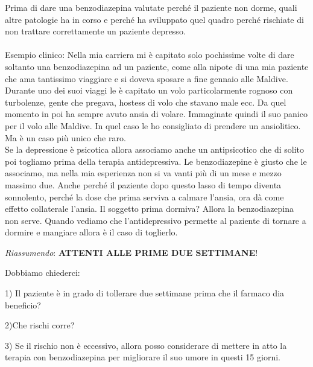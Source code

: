 \begin{itemize}
Prima di dare una benzodiazepina valutate perché il paziente non dorme,
quali altre patologie ha in corso e perché ha sviluppato quel quadro
perché rischiate di non trattare correttamente un paziente depresso.
\\\\
Esempio clinico: Nella mia carriera mi è capitato solo pochissime volte
di dare soltanto una benzodiazepina ad un paziente, come alla nipote di
una mia paziente che ama tantissimo viaggiare e si doveva sposare a fine
gennaio alle Maldive. Durante uno dei suoi viaggi le è capitato un volo
particolarmente rognoso con turbolenze, gente che pregava, hostess di
volo che stavano male ecc. Da quel momento in poi ha sempre avuto ansia
di volare. Immaginate quindi il suo panico per il volo alle Maldive. In
quel caso le ho consigliato di prendere un ansiolitico. Ma è un caso più
unico che raro.\\
Se la depressione è psicotica allora associamo anche un antipsicotico
che di solito poi togliamo prima della terapia antidepressiva. Le
benzodiazepine è giusto che le associamo, ma nella mia esperienza non si
va vanti più di un mese e mezzo massimo due. Anche perché il paziente
dopo questo lasso di tempo diventa sonnolento, perché la dose che prima
serviva a calmare l'ansia, ora dà come effetto collaterale l'ansia. Il
soggetto prima dormiva? Allora la benzodiazepina non serve. Quando
vediamo che l'antidepressivo permette al paziente di tornare a dormire e
mangiare allora è il caso di toglierlo.
\end{itemize}

\emph{Riassumendo}: \textbf{ATTENTI ALLE PRIME DUE SETTIMANE}!

Dobbiamo chiederci:

1) Il paziente è in grado di tollerare due settimane prima che il
farmaco dia beneficio?

2)Che rischi corre?

3) Se il rischio non è eccessivo, allora posso considerare di mettere in
atto la terapia con benzodiazepina per migliorare il suo umore in questi
15 giorni.

